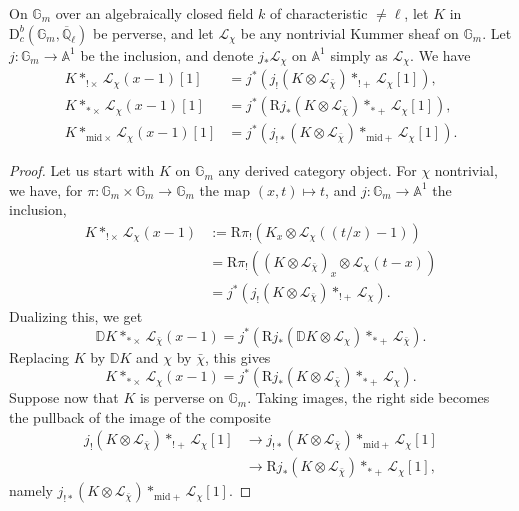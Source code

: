 On \(\mathbb{G}_m\) over an algebraically closed field \(k\) of characteristic
\(\ne\ell\), let \(K\) in
\(\mathrm{D}^b_c(\mathbb{G}_m,\overline{\mathbb{Q}}_\ell)\) be perverse, and
let \(\mathcal{L}_\chi\) be any nontrivial Kummer sheaf on \(\mathbb{G}_m\).
Let \(j:\mathbb{G}_m\to\mathbb{A}^1\) be the inclusion, and denote
\(j_*\mathcal{L}_\chi\) on \(\mathbb{A}^1\) simply as \(\mathcal{L}_\chi\). We
have
\[
\begin{aligned}
  K*_{!\times}\mathcal{L}_\chi(x-1)[1]
  &=j^*(j_!(K\otimes\mathcal{L}_{\bar{\chi}})*_{!+}\mathcal{L}_\chi[1]),\\
  K*_{*\times}\mathcal{L}_\chi(x-1)[1]
  &=j^*(\mathrm{R}j_*(K\otimes\mathcal{L}_{\bar{\chi}})
    *_{*+}\mathcal{L}_\chi[1]),\\
  K*_{\mathrm{mid}\times}\mathcal{L}_\chi(x-1)[1]
  &=j^*(j_{!*}(K\otimes\mathcal{L}_{\bar{\chi}})
    *_{\mathrm{mid}+}\mathcal{L}_\chi[1]).
\end{aligned}
\]
\begin{proof}
Let us start with \(K\) on \(\mathbb{G}_m\) any derived category object. For
\(\chi\) nontrivial, we have, for
\(\pi:\mathbb{G}_m\times\mathbb{G}_m\to\mathbb{G}_m\) the map
\((x,t)\mapsto t\), and \(j:\mathbb{G}_m\to\mathbb{A}^1\) the inclusion,
\[
\begin{aligned}
  K*_{!\times}\mathcal{L}_\chi(x-1)
  &:=
  \mathrm{R}\pi_!(K_x\otimes\mathcal{L}_\chi((t/x)-1))\\
  &=
  \mathrm{R}\pi_!((K\otimes\mathcal{L}_{\bar{\chi}})_x
    \otimes\mathcal{L}_\chi(t-x))\\
  &=
  j^*(j_!(K\otimes\mathcal{L}_{\bar{\chi}})*_{!+}\mathcal{L}_\chi).
\end{aligned}
\]
Dualizing this, we get
\[
  \mathbb{D}K*_{*\times}\mathcal{L}_{\bar{\chi}}(x-1)
  =
  j^*(\mathrm{R}j_*(\mathbb{D}K\otimes\mathcal{L}_\chi)
  *_{*+}\mathcal{L}_{\bar{\chi}}).
\]
Replacing \(K\) by \(\mathbb{D}K\) and \(\chi\) by \(\bar{\chi}\), this gives
\[
  K*_{*\times}\mathcal{L}_\chi(x-1)
  =
  j^*(\mathrm{R}j_*(K\otimes\mathcal{L}_{\bar{\chi}})
  *_{*+}\mathcal{L}_\chi).
\]
Suppose now that \(K\) is perverse on \(\mathbb{G}_m\). Taking images, the
right side becomes the pullback of the image of the composite
\[
\begin{aligned}
  j_!(K\otimes\mathcal{L}_{\bar{\chi}})*_{!+}\mathcal{L}_\chi[1]
  &\to
  j_{!*}(K\otimes\mathcal{L}_{\bar{\chi}})
  *_{\mathrm{mid}+}\mathcal{L}_\chi[1]\\
  &\to
  \mathrm{R}j_*(K\otimes\mathcal{L}_{\bar{\chi}})
  *_{*+}\mathcal{L}_\chi[1],
\end{aligned}
\]
namely
\(j_{!*}(K\otimes\mathcal{L}_{\bar{\chi}})
*_{\mathrm{mid}+}\mathcal{L}_\chi[1]\).
\end{proof}

